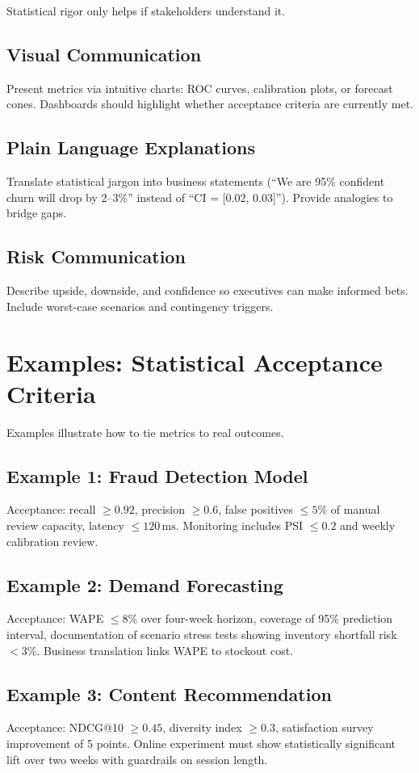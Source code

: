 Statistical rigor only helps if stakeholders understand it.

\subsection{Visual Communication}
Present metrics via intuitive charts: ROC curves, calibration plots, or forecast cones. Dashboards should highlight whether acceptance criteria are currently met.

\subsection{Plain Language Explanations}
Translate statistical jargon into business statements (``We are 95\% confident churn will drop by 2--3\%'' instead of ``CI = [0.02, 0.03]''). Provide analogies to bridge gaps.

\subsection{Risk Communication}
Describe upside, downside, and confidence so executives can make informed bets. Include worst-case scenarios and contingency triggers.

\section{Examples: Statistical Acceptance Criteria}
\label{sec:statistical-examples}

Examples illustrate how to tie metrics to real outcomes.

\subsection{Example 1: Fraud Detection Model}
Acceptance: recall $\ge 0.92$, precision $\ge 0.6$, false positives $\le 5\%$ of manual review capacity, latency $\le 120\,\text{ms}$. Monitoring includes PSI $\le 0.2$ and weekly calibration review.

\subsection{Example 2: Demand Forecasting}
Acceptance: WAPE $\le 8\%$ over four-week horizon, coverage of 95\% prediction interval, documentation of scenario stress tests showing inventory shortfall risk $<3\%$. Business translation links WAPE to stockout cost.

\subsection{Example 3: Content Recommendation}
Acceptance: NDCG@10 $\ge 0.45$, diversity index $\ge 0.3$, satisfaction survey improvement of 5 points. Online experiment must show statistically significant lift over two weeks with guardrails on session length.

